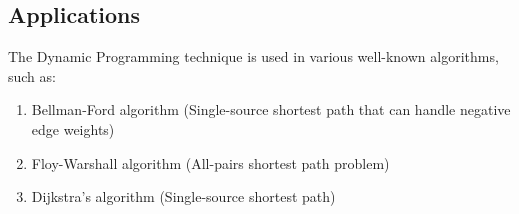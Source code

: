 \subsection{Applications}
The Dynamic Programming technique is used in various well-known algorithms, such as:
\begin{enumerate}
 \item Bellman-Ford algorithm (Single-source shortest path that can handle negative edge weights)
 \item Floy-Warshall algorithm (All-pairs shortest path problem)
 \item Dijkstra's algorithm (Single-source shortest path)
\end{enumerate}
